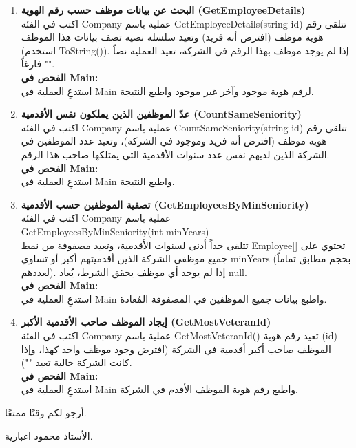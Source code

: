 \documentclass[14pt]{extarticle}
\begin{document}
\begin{enumerate}[label=\textbf{تمرين \arabic*:}, wide=0pt, itemsep=2.2em]
    \item \textbf{البحث عن بيانات موظف حسب رقم الهوية (\textenglish{GetEmployeeDetails})} \\
    اكتب في الفئة \textenglish{Company} عملية باسم \textenglish{GetEmployeeDetails(string id)} تتلقى رقم هوية موظف (افترض أنه فريد) وتعيد سلسلة نصية تصف بيانات هذا الموظف (استخدم \textenglish{ToString()}). إذا لم يوجد موظف بهذا الرقم في الشركة، تعيد العملية نصاً فارغاً \textenglish{""}. \\
    \textbf{الفحص في \textenglish{Main}:} \\
    استدعِ العملية في \textenglish{Main} لرقم هوية موجود وآخر غير موجود واطبع النتيجة.
    \filbreak

    \item \textbf{عدّ الموظفين الذين يملكون نفس الأقدمية (\textenglish{CountSameSeniority})} \\
    اكتب في الفئة \textenglish{Company} عملية باسم \textenglish{CountSameSeniority(string id)} تتلقى رقم هوية موظف (افترض أنه فريد وموجود في الشركة)، وتعيد عدد الموظفين في الشركة الذين لديهم نفس عدد سنوات الأقدمية التي يمتلكها صاحب هذا الرقم. \\
    \textbf{الفحص في \textenglish{Main}:} \\
    استدعِ العملية في \textenglish{Main} واطبع النتيجة.
    \filbreak

    \item \textbf{تصفية الموظفين حسب الأقدمية (\textenglish{GetEmployeesByMinSeniority})} \\
    اكتب في الفئة \textenglish{Company} عملية باسم \\
    \textenglish{GetEmployeesByMinSeniority(int minYears)} \\
    تتلقى حداً أدنى لسنوات الأقدمية، وتعيد مصفوفة من نمط \textenglish{Employee[]} تحتوي على جميع موظفي الشركة الذين أقدميتهم أكبر أو تساوي \textenglish{minYears} (بحجم مطابق تماماً لعددهم). إذا لم يوجد أي موظف يحقق الشرط، يُعاد \textenglish{null}. \\
    \textbf{الفحص في \textenglish{Main}:} \\
    استدعِ العملية في \textenglish{Main} واطبع بيانات جميع الموظفين في المصفوفة المُعادة.
    \filbreak

    \item \textbf{إيجاد الموظف صاحب الأقدمية الأكبر (\textenglish{GetMostVeteranId})} \\
    اكتب في الفئة \textenglish{Company} عملية باسم \textenglish{GetMostVeteranId()} تعيد رقم هوية (\textenglish{id}) الموظف صاحب أكبر أقدمية في الشركة (افترض وجود موظف واحد كهذا، وإذا كانت الشركة خالية تعيد \textenglish{""}). \\
    \textbf{الفحص في \textenglish{Main}:} \\
    استدعِ العملية في \textenglish{Main} واطبع رقم هوية الموظف الأقدم في الشركة.
    \filbreak

\end{enumerate}

\vspace{1cm}
\begin{flushleft}
أرجو لكم وقتًا ممتعًا.

الأستاذ محمود اغبارية.
\end{flushleft}
\end{document}
